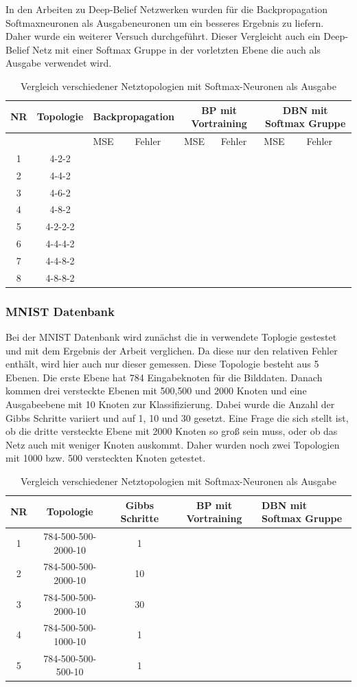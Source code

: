 \documentclass[12pt]{article}
\begin{document}
	In den Arbeiten zu Deep-Belief Netzwerken wurden für die Backpropagation Softmaxneuronen als Ausgabeneuronen um ein besseres Ergebnis zu liefern. Daher wurde ein weiterer Versuch durchgeführt. Dieser Vergleicht auch ein Deep-Belief Netz mit einer Softmax Gruppe in der vorletzten Ebene die auch als Ausgabe verwendet wird.

\begin{table}[H]
\begin{tabularx}{\textwidth}{|c|c|X|X|X|X|X|X|}
	\hline
	NR & Topologie & \multicolumn{2}{|c|}{Backpropagation} & \multicolumn{2}{|c|}{BP mit Vortraining} & \multicolumn{2}{|c|}{DBN mit Softmax Gruppe}\\\hline
	&&MSE& Fehler&MSE& Fehler&MSE& Fehler
	\\\hline
	1&4-2-2&&&&&&\\\hline
	2&4-4-2&&&&&&\\\hline
	3&4-6-2&&&&&&\\\hline
	4&4-8-2&&&&&&\\\hline
	5&4-2-2-2&&&&&&\\\hline
	6&4-4-4-2&&&&&&\\\hline
	7&4-4-8-2&&&&&&\\\hline
	8&4-8-8-2&&&&&&\\\hline
	\end{tabularx}
	\caption{Vergleich verschiedener Netztopologien mit Softmax-Neuronen als Ausgabe}
	\end{table}
	\subsubsection{MNIST Datenbank}
	
	Bei der MNIST Datenbank wird zunächst die in \cite{learning} verwendete Toplogie gestestet und mit dem Ergebnis der Arbeit verglichen. Da diese nur den relativen Fehler enthält, wird hier auch nur dieser gemessen. Diese Topologie besteht aus 5 Ebenen. Die erste Ebene hat 784 Eingabeknoten für die Bilddaten. Danach kommen drei versteckte Ebenen mit 500,500 und 2000 Knoten und eine Ausgabeebene mit 10 Knoten zur Klassifizierung. Dabei wurde die Anzahl der Gibbs Schritte variiert und auf 1, 10 und 30 gesetzt. Eine Frage die sich stellt ist, ob die dritte versteckte Ebene mit 2000 Knoten so groß sein muss, oder ob das Netz auch mit weniger Knoten auskommt. Daher wurden noch zwei Topologien mit 1000 bzw. 500 versteckten Knoten getestet.
	\begin{table}[H]
\begin{tabularx}{\textwidth}{|c|c|c|c|X|}
	\hline
	NR & Topologie &Gibbs Schritte& BP mit Vortraining & DBN mit Softmax Gruppe
	\\\hline
	1&784-500-500-2000-10&1&&\\\hline
	2&784-500-500-2000-10&10&&\\\hline
	3&784-500-500-2000-10&30&&\\\hline
	4&784-500-500-1000-10&1&&\\\hline
	5&784-500-500-500-10&1&&\\\hline
	\end{tabularx}
	\caption{Vergleich verschiedener Netztopologien mit Softmax-Neuronen als Ausgabe}
	\end{table}
	
\end{document}
